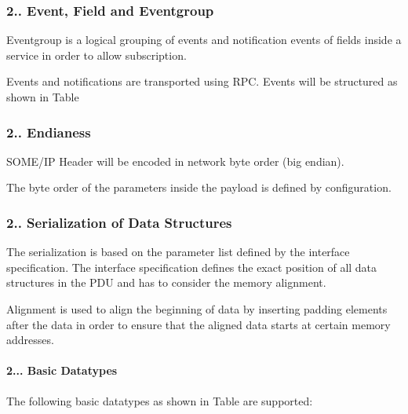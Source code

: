 \subsubsection*{2.. Event, Field and Eventgroup}


\begin{DoxyItemize}
\item Eventgroup is a logical grouping of events and notification events of fields inside a service in order to allow subscription.
\item Events and notifications are transported using R\+PC. Events will be structured as shown in Table 
\end{DoxyItemize}

\subsubsection*{2.. Endianess}


\begin{DoxyItemize}
\item S\+O\+M\+E/\+IP Header will be encoded in network byte order (big endian).
\item The byte order of the parameters inside the payload is defined by configuration.
\end{DoxyItemize}

\subsubsection*{2.. Serialization of Data Structures}


\begin{DoxyItemize}
\item The serialization is based on the parameter list defined by the interface specification. The interface specification defines the exact position of all data structures in the P\+DU and has to consider the memory alignment.
\item Alignment is used to align the beginning of data by inserting padding elements after the data in order to ensure that the aligned data starts at certain memory addresses.
\end{DoxyItemize}

\paragraph*{2... Basic Datatypes}

The following basic datatypes as shown in Table are supported\+:

